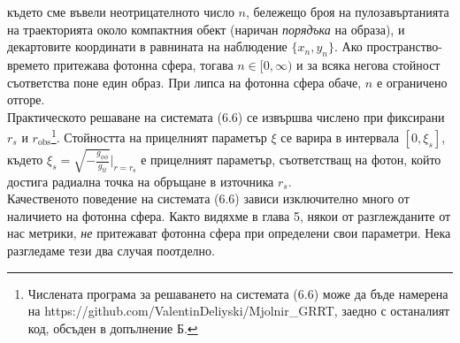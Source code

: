 където сме въвели неотрицателното число $n$, бележещо броя на пулозавъртанията на траекторията около компактния обект (наричан \emph{порядъка} на образа), и декартовите координати в равнината на наблюдение $\{x_n,y_n\}$. Ако пространство-времето притежава фотонна сфера, тогава $n \in [0,\infty)$ и за всяка негова стойност съответства поне един образ. При липса на фотонна сфера обаче, $n$ е ограничено отгоре.\\ 

Практическото решаване на системата (6.6) се извършва числено при фиксирани $r_s$ и $r_\text{obs}$\footnote{ Числената програма за решаването на системата (6.6) може да бъде намерена на https://github.com/ValentinDeliyski/Mjolnir\_GRRT, заедно с останалият код, обсъден в допълнение Б.}. Стойността на прицелният параметър $\xi$ се варира в интервала $\left[0, \xi_s\right]$, където $\xi_s = \sqrt{-\frac{g_{\phi\phi}}{g_{tt}}}\big\vert_{r = r_\text{s}}$ е прицелният параметър, съответстващ на фотон, който достига радиална точка на обръщане в източника $r_s$.\\

Качественото поведение на системата (6.6) зависи изключително много от наличието на фотонна сфера. Както видяхме в глава 5, някои от разглежданите от нас метрики, \emph{не} притежават фотонна сфера при определени свои параметри. Нека разгледаме тези два случая поотделно.


